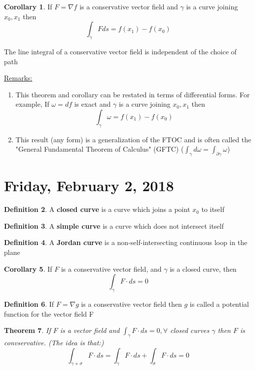 \documentclass[12pt]{article}
\theoremstyle{plain}
\newtheorem{theorem}{Theorem}[section]
\theoremstyle{definition}
\newtheorem{definition}[theorem]{Definition}
\newtheorem{corollary}[theorem]{Corollary}
\begin{document}
\begin{corollary}
	If $F = \nabla f$ is a conservative vector field and $\gamma$ is a curve joining $x_0, x_1$ then
	$$\int_\gamma Fds = f(x_1) - f(x_0)$$
\end{corollary}

The line integral of a conservative vector field is independent of the choice of path

\underline{Remarks:}
\begin{enumerate}
	\item{This theorem and corollary can be restated in terms of differential forms. For example, If $\omega = df$ is exact and $\gamma$ is a curve joining $x_0, x_1$ then $$\int_\gamma \omega = f(x_1) - f(x_0)$$}
	\item{
	This result (any form) is a generalization of the FTOC and is often called the "General Fundamental Theorem of Calculus" (GFTC) ($\int_\gamma d\omega = \int_{\partial \gamma} \omega$)
	}
\end{enumerate}

\newpage

\section{Friday, February 2, 2018}

\begin{definition}
  A \textbf{closed curve} is a curve which joins a point $x_0$ to itself
\end{definition}

\begin{definition}
  A \textbf{simple curve} is a curve which does not intersect itself
\end{definition}

\begin{definition}
  A \textbf{Jordan curve} is a non-self-intersecting continuous loop in the plane
\end{definition}

\begin{corollary}
  If $F$ is a conservative vector field, and $\gamma$ is a closed curve, then
  $$\int_\gamma F\cdot ds = 0$$
\end{corollary}

\begin{definition}
  If $F=\nabla g$ is a conservative vector field then $g$ is called a potential function for the vector field F
\end{definition}

\begin{theorem}
  If $F$ is a vector field and $\int_\gamma F\cdot ds = 0, \forall$ closed curves $\gamma$ then $F$ is convservative. (The idea is that:)
  $$\int_{\gamma+\sigma} F\cdot ds = \int_\gamma F\cdot ds + \int_\sigma F\cdot ds = 0$$
\end{theorem}
\end{document}

